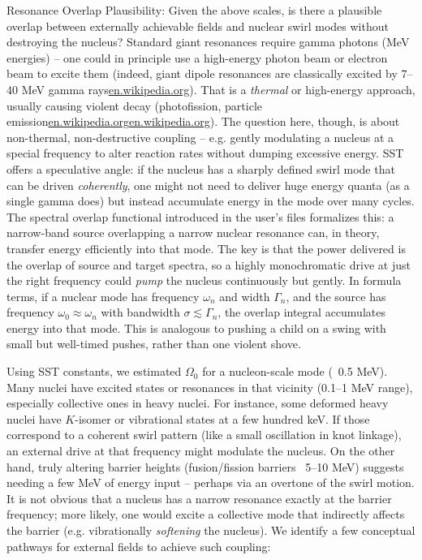 \documentclass[11pt]{article}
\begin{document}
Resonance Overlap Plausibility: Given the above scales, is there a plausible overlap between externally achievable fields and nuclear swirl modes without destroying the nucleus? Standard giant resonances require gamma photons (MeV energies) – one could in principle use a high-energy photon beam or electron beam to excite them (indeed, giant dipole resonances are classically excited by 7–40 MeV gamma rays\href{https://en.wikipedia.org/wiki/Giant_resonance#:~:text=Giant%20dipole%20resonances%20can%20be,cause%20the%20average%20gamma%20decay}{en.wikipedia.org}). That is a \textit{thermal} or high-energy approach, usually causing violent decay (photofission, particle emission\href{https://en.wikipedia.org/wiki/Giant_resonance#:~:text=}{en.wikipedia.org}\href{https://en.wikipedia.org/wiki/Giant_resonance#:~:text=Giant%20dipole%20resonances%20can%20be,cause%20the%20average%20gamma%20decay}{en.wikipedia.org}). The question here, though, is about non-thermal, non-destructive coupling – e.g. gently modulating a nucleus at a special frequency to alter reaction rates without dumping excessive energy. SST offers a speculative angle: if the nucleus has a sharply defined swirl mode that can be driven \textit{coherently}, one might not need to deliver huge energy quanta (as a single gamma does) but instead accumulate energy in the mode over many cycles. The spectral overlap functional introduced in the user’s files formalizes this: a narrow-band source overlapping a narrow nuclear resonance can, in theory, transfer energy efficiently into that mode. The key is that the power delivered is the overlap of source and target spectra, so a highly monochromatic drive at just the right frequency could \textit{pump} the nucleus continuously but gently. In formula terms, if a nuclear mode has frequency $\omega_n$ and width $\Gamma_n$, and the source has frequency $\omega_0\approx\omega_n$ with bandwidth $\sigma \lesssim \Gamma_n$, the overlap integral accumulates energy into that mode. This is analogous to pushing a child on a swing with small but well-timed pushes, rather than one violent shove.


Using SST constants, we estimated $\Omega_0$ for a nucleon-scale mode (~0.5 MeV). Many nuclei have excited states or resonances in that vicinity (0.1–1 MeV range), especially collective ones in heavy nuclei. For instance, some deformed heavy nuclei have $K$-isomer or vibrational states at a few hundred keV. If those correspond to a coherent swirl pattern (like a small oscillation in knot linkage), an external drive at that frequency might modulate the nucleus. On the other hand, truly altering barrier heights (fusion/fission barriers ~5–10 MeV) suggests needing a few MeV of energy input – perhaps via an overtone of the swirl motion. It is not obvious that a nucleus has a narrow resonance exactly at the barrier frequency; more likely, one would excite a collective mode that indirectly affects the barrier (e.g. vibrationally \textit{softening} the nucleus). We identify a few conceptual pathways for external fields to achieve such coupling:
\end{document}

